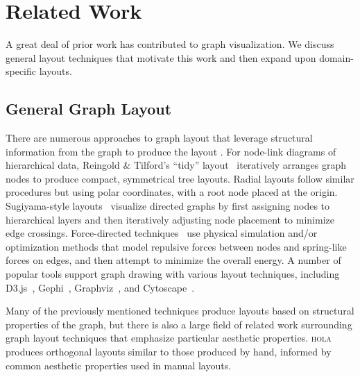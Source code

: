 \section{Related Work}

A great deal of prior work has contributed to graph visualization.
We discuss general layout techniques that motivate this work and
then expand upon domain-specific layouts.

\subsection{General Graph Layout}
There are numerous approaches to graph layout that leverage structural
information from the graph to produce the layout \cite{herman2000graph,eades2010graph,gibson2013survey}.
For node-link diagrams of hierarchical data, Reingold \& Tilford's ``tidy'' 
layout~\cite{reingold1981tidier} iteratively arranges graph nodes to
produce compact, symmetrical tree layouts.
Radial layouts  follow similar procedures but using polar coordinates, with a root node placed at the origin.
Sugiyama-style layouts~\cite{sugiyama1981methods} visualize directed graphs by first assigning nodes to hierarchical layers and then iteratively adjusting node placement to minimize edge crossings.
Force-directed techniques~\cite{tutte1963draw,kobourov2012spring,quinn1979forced,fruchterman1991graph} 
use physical simulation and/or optimization methods that model repulsive forces between nodes and spring-like forces on edges, and then attempt to minimize the overall energy. 
A number of popular tools support graph drawing with various layout 
techniques, including D3.js~\cite{bostock:d3}, Gephi~\cite{bastian2009gephi},
Graphviz~\cite{ellson2001graphviz}, and Cytoscape~\cite{shannon2003cytoscape}.

Many of the previously mentioned techniques produce layouts based on structural
properties of the graph, but there is also a large field of 
related work surrounding graph layout techniques that emphasize particular
aesthetic properties. \textsc{hola} \cite{kieffer2016hola} produces orthogonal 
layouts similar to those produced by hand, informed by common aesthetic properties 
used in manual layouts.


